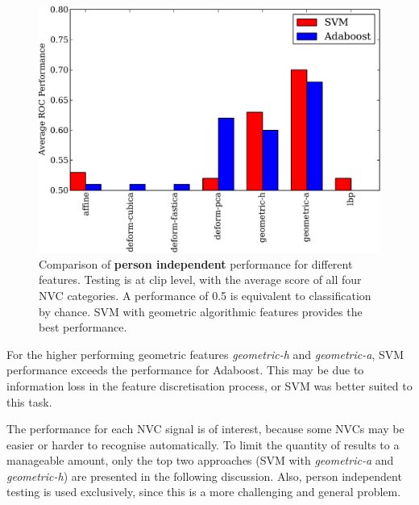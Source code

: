 \begin{figure}[tb]
\centering
\includegraphics[width = 0.6 \columnwidth]{nvcclass/compare-person-indep.pdf}
\caption[Comparison of \textbf{person independent} performance for different features.]{Comparison of \textbf{person independent} performance for different features. Testing is at clip level, with the average score of all four \ac{NVC} categories. A performance of 0.5 is equivalent to classification by chance. SVM with geometric algorithmic features provides the best performance.}
\label{PersonIndependentCompareGraph}
\end{figure}



For the higher performing geometric features \textit{geometric-h} and \textit{geometric-a}, \ac{SVM} performance exceeds the performance for Adaboost. This may be due to information loss in the feature discretisation process, or \ac{SVM} was better suited to this task.

The performance for each \ac{NVC} signal is of interest, because some \ac{NVC}s may be easier or harder to recognise automatically. 
To limit the quantity of results to a manageable amount, only the top two approaches (SVM with \textit{geometric-a} and \textit{geometric-h}) are presented in the following discussion. Also, person independent testing is used exclusively, since this is a more challenging and general problem.

